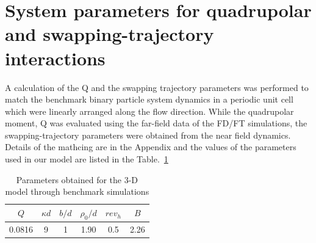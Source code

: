 \section{System parameters for quadrupolar and swapping-trajectory interactions}
A calculation of the Q and the swapping trajectory parameters was performed to match the benchmark binary particle system dynamics in a periodic unit cell which were linearly arranged along the flow direction. While the quadrupolar moment, Q was evaluated using the far-field data of the FD/FT simulations, the swapping-trajectory parameters were obtained from the near field dynamics. Details of the mathcing are in the Appendix and the values of the parameters used in our model are listed in the Table.~\ref{tab:table1}

\begin{table}[htb!]
  \caption{Parameters obtained for the 3-D model through benchmark simulations}
  \centering 
  \label{tab:table1}
  \begin{tabular}{c c c c c c} %
  \hline\hline                        %
  \textbf{$Q$} & \textbf{$\kappa d$} & \textbf{$b/d$} & \textbf{$\rho_0/d$} & \textbf{$rev_h$} & \textbf{$B$} \\
  \hline
  0.0816 & 9 & 1 & 1.90 & 0.5 & 2.26\\
  \hline
\end{tabular}
\end{table}